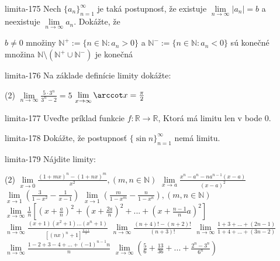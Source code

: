 \begin{defproblem}{limita-175}
Nech ${\{a_n\}}_{n=1}^\infty$ je taká postupnosť, že existuje $\lim\limits_{n \rightarrow \infty} |a_n|=b$ a neexistuje $\lim\limits_{n \rightarrow \infty} a_n$. Dokážte, že
\begin{tasks}
\task $b \neq 0$
\task množiny $\mathbb{N^+}:= \{n \in \mathbb{N}: a_n>0 \}$ a $\mathbb{N^-}:= \{n \in \mathbb{N}: a_n<0 \}$ sú konečné
\task množina $\mathbb{N} \setminus (\mathbb{N^+} \cup \mathbb{N^-})$ je konečná
\end{tasks}
\end{defproblem}

\begin{defproblem}{limita-176}
Na základe definície limity dokážte:
\begin{tasks}(2)
    \task $\lim\limits_{n \rightarrow \infty} \frac{5 \cdot 3^n}{3^n-2}=5$
    \task $\lim\limits_{x \rightarrow \infty} \arccot x=\frac{\pi}{2}$
\end{tasks}
\end{defproblem}

\begin{defproblem}{limita-177}
Uveďte príklad funkcie $f: \mathbb{R} \rightarrow \mathbb{R}$, Ktorá má limitu len v bode $0$.
\end{defproblem}

\begin{defproblem}{limita-178}
Dokážte, že postupnosť ${\{\sin n\}}_{n=1}^\infty$ nemá limitu.
\end{defproblem}

\begin{defproblem}{limita-179}
Nájdite limity:
\begin{tasks}(2)
    \task* $\lim\limits_{x \rightarrow 0} \frac{(1+mx)^n-(1+nx)^m}{x^2},(m,n \in \mathbb{N})$
    \task $\lim\limits_{x \rightarrow a} \frac{x^n-a^n-na^{n-1}(x-a)}{(x-a)^2}$
    \task $\lim\limits_{x \rightarrow 1} (\frac{3}{1-x^2}-\frac{1}{x-1})$
    \task* $\lim\limits_{x \rightarrow 1} (\frac{m}{1-x^m}-\frac{n}{1-x^n}),(m,n \in \mathbb{N})$
    \task* $\lim\limits_{x \rightarrow \infty} \frac{1}{n}[(x+\frac{a}{n})^2+(x+\frac{2a}{n})^2+...+(x+\frac{n-1}{n}a)^2]$
    \task $\lim\limits_{n\rightarrow \infty} \frac{(x+1)(x^2+1)...(x^n+1)}{[(nx)^n+1]^{\frac{n+1}{2}}}$
    \task $\lim\limits_{n \rightarrow \infty} \frac{(n+4)!-(n+2)!}{(n+3)!}$
    \task $\lim\limits_{n \rightarrow \infty} \frac{1+3+...+(2n-1)}{1+4+...+(3n-2)}$
    \task $\lim\limits_{n \rightarrow \infty} \frac{1-2+3-4+...+(-1)^{n-1}n}{n}$
    \task $\lim\limits_{x \rightarrow \infty} (\frac{5}{6}+\frac{13}{36}+...+\frac{2^n-3^n}{6^n})$
\end{tasks}
\end{defproblem}

